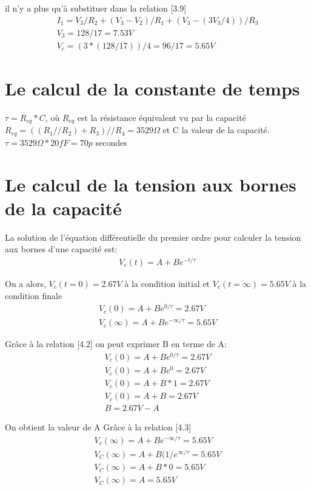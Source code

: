 \documentclass{homeworg}
\begin{document}
    il n’y a plus qu’à substituer dans la relation [3.9]
    \begin{align}
        I_1 = V_3 / R_2 + (V_3 - V_2) / R_1 + (V_3 - (3V_3 / 4)) / R_3\\
        V_3 = 128/17 = 7.53V\\
        V_c = (3 * (128 / 17)) / 4 = 96/17 = 5.65V
    \end{align}

\newpage
\section{Le calcul de la constante de temps}
$\tau = R_{eq} * C$, où $R_{eq}$ est la résistance équivalent vu par la capacité $R_{eq} = ((R_1 // R_2) + R_3) // R_4 = 3529\Omega$ et C la valeur de la capacité. $\tau = 3529\Omega * 20fF = 70p$ secondes

\section{Le calcul de la tension aux bornes de la capacité}
La solution de l'équation différentielle du premier ordre pour calculer la tension aux bornes d'une capacité est:
\begin{align}
     V_c(t) = A + B e^{-t / \tau}
\end{align}

On a alors, $V_c(t=0) = 2.67V$ à la condition initial et $V_c(t=\infty)= 5.65V$ à la condition finale
\begin{align}
    V_c(0) = A + B e^{0/ \tau} = 2.67V\\
    V_c(\infty) = A + B e^{-\infty/ \tau} = 5.65V
\end{align}

Grâce à la relation [4.2] on peut exprimer B en terme de A:
\begin{align}
    V_c(0) = A + B e^{0/ \tau} = 2.67V\\
    V_c(0) = A + B e^{0} = 2.67V\\
    V_c(0) = A + B * 1 = 2.67V\\
    V_c(0) = A + B = 2.67V\\
    B = 2.67V - A
\end{align}

On obtient la valeur de A Grâce à la relation [4.3]
\begin{align}
    V_c(\infty) = A + B e^{-\infty/ \tau} = 5.65V\\
    V_C(\infty) = A + B (1 / e^{\infty/ \tau} = 5.65V\\
    V_C(\infty) = A + B * 0 = 5.65V\\
    V_C(\infty) = A = 5.65V
\end{align}
\end{document}

